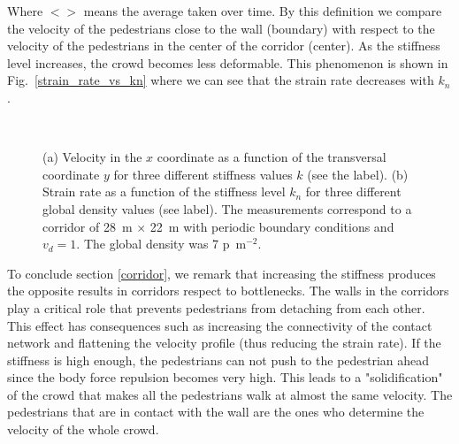 \documentclass[preprint,12pt]{elsarticle}
\begin{document}
Where $<>$ means the average taken over time. By this definition we compare the velocity of the pedestrians close to the wall (boundary) with respect to the velocity of the pedestrians in the center of the corridor (center). As the stiffness level increases, the crowd becomes less deformable. This phenomenon is shown in Fig.~\ref{strain_rate_vs_kn} where we can see that the strain rate decreases with $k_n$. \\



\begin{figure}[!htbp]
\centering
    \ 
    \\
\caption[width=0.47\columnwidth]{(a) Velocity in the $x$ coordinate as a function of the transversal coordinate $y$ for three different stiffness values $k$ (see the label). (b) Strain rate as a function of the stiffness level $k_n$ for three different global density values (see label). The measurements correspond to a corridor of 28~m $\times$ 22~m with periodic boundary conditions and $v_d=1$. The global density was 7 p~m$^{-2}$.  }
\label{profile_strain}
\end{figure}


To conclude section \ref{corridor}, we remark that increasing the stiffness produces the opposite results in corridors respect to bottlenecks. The walls in the corridors play a critical role that prevents pedestrians from detaching from each other. This effect has consequences such as increasing the connectivity of the contact network and flattening the velocity profile (thus reducing the strain rate). If the stiffness is high enough, the pedestrians can not push to the pedestrian ahead since the body force repulsion becomes very high. This leads to a "solidification" of the crowd that makes all the pedestrians walk at almost the same velocity. The pedestrians that are in contact with the wall are the ones who determine the velocity of the whole crowd. \\
\end{document}
